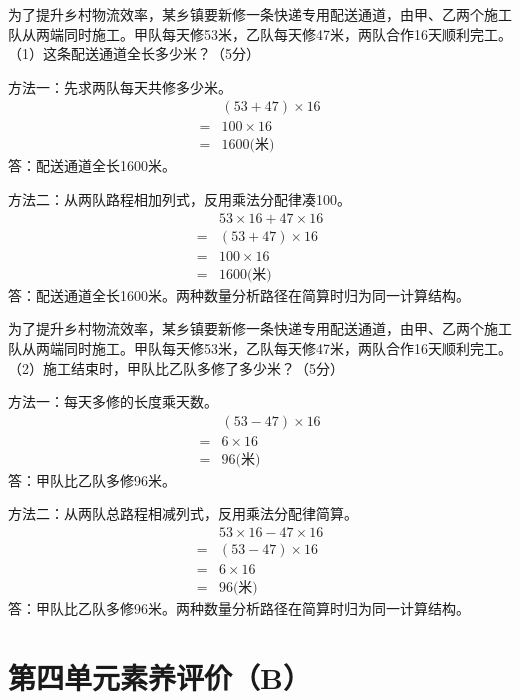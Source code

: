 为了提升乡村物流效率，某乡镇要新修一条快递专用配送通道，由甲、乙两个施工队从两端同时施工。甲队每天修53米，乙队每天修47米，两队合作16天顺利完工。（1）这条配送通道全长多少米？（5分）\par
\begin{BookAnswer}
方法一：先求两队每天共修多少米。\[\begin{aligned}&(53+47)\times16\\={}&100\times16\\={}&1600\text{(米)}\end{aligned}\]答：配送通道全长1600米。\par 方法二：从两队路程相加列式，反用乘法分配律凑100。\[\begin{aligned}&53\times16+47\times16\\={}&(53+47)\times16\\={}&100\times16\\={}&1600\text{(米)}\end{aligned}\]答：配送通道全长1600米。两种数量分析路径在简算时归为同一计算结构。
\end{BookAnswer}

为了提升乡村物流效率，某乡镇要新修一条快递专用配送通道，由甲、乙两个施工队从两端同时施工。甲队每天修53米，乙队每天修47米，两队合作16天顺利完工。（2）施工结束时，甲队比乙队多修了多少米？（5分）\par
\begin{BookAnswer}
方法一：每天多修的长度乘天数。\[\begin{aligned}&(53-47)\times16\\={}&6\times16\\={}&96\text{(米)}\end{aligned}\]答：甲队比乙队多修96米。\par 方法二：从两队总路程相减列式，反用乘法分配律简算。\[\begin{aligned}&53\times16-47\times16\\={}&(53-47)\times16\\={}&6\times16\\={}&96\text{(米)}\end{aligned}\]答：甲队比乙队多修96米。两种数量分析路径在简算时归为同一计算结构。
\end{BookAnswer}


\section{第四单元素养评价（B）}

